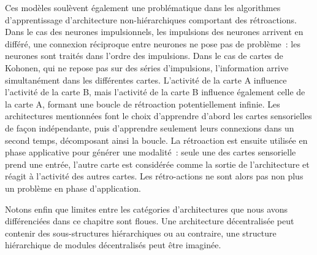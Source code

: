 \documentclass[../main]{subfiles}
\begin{document}
Ces modèles soulèvent également une problématique dans les algorithmes d'apprentissage d'architecture non-hiérarchiques comportant des rétroactions. Dans le cas des neurones impulsionnels, les impulsions des neurones arrivent en différé, une connexion réciproque entre neurones ne pose pas de problème~: les neurones sont traités dans l'ordre des impulsions. Dans le cas de cartes de Kohonen, qui ne repose pas sur des séries d'impulsions, l'information arrive simultanément dans les différentes cartes. L'activité de la carte A influence l'activité de la carte B, mais l'activité de la carte B influence également celle de la carte A, formant une boucle de rétroaction potentiellement infinie. Les architectures mentionnées font le choix d'apprendre d'abord les cartes sensorielles de façon indépendante, puis d'apprendre seulement leurs connexions dans un second temps, décomposant ainsi la boucle. 
La rétroaction est ensuite utilisée en phase applicative pour générer une modalité~: seule une des cartes sensorielle prend une entrée, l'autre carte est considérée comme la sortie de l'architecture et réagit à l'activité des autres cartes. Les rétro-actions ne sont alors pas non plus un problème en phase d'application.

Notons enfin que limites entre les catégories d'architectures que nous avons différenciées dans ce chapitre sont floues. Une architecture décentralisée peut contenir des sous-structures hiérarchiques ou au contraire, une structure hiérarchique de modules décentralisés peut être imaginée.
\end{document}
